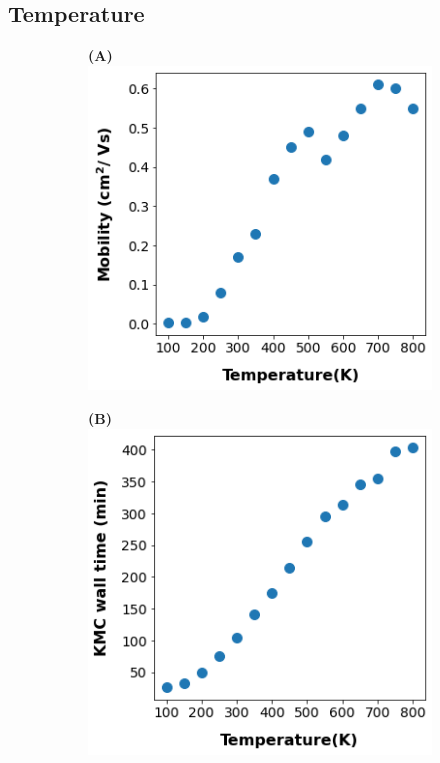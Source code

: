 \subsection{Temperature}
\begin{figure}
\centering
\begin{subfigure}{.5\textwidth}
    \textbf{(A)}
    \centering
    \includegraphics[width=.9\textwidth]{figures/temp.png}
    \newline
\end{subfigure}%
\begin{subfigure}{.5\textwidth}
    \textbf{(B)}
    \centering
    \includegraphics[width=.9\textwidth]{figures/temp_simtime_plot.png}

\end{subfigure}
\end{figure}
